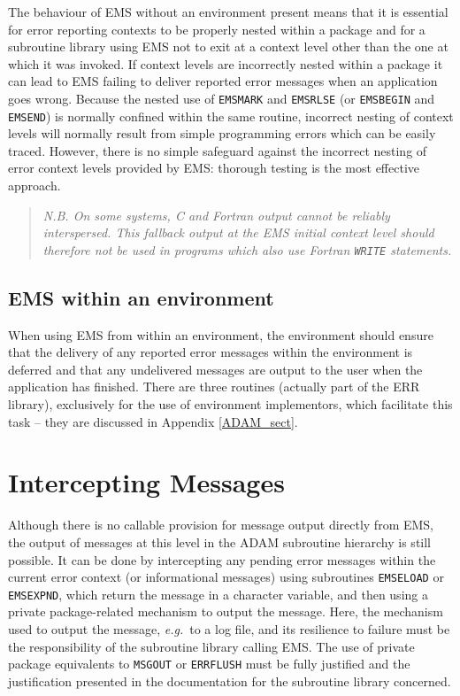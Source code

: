 \documentclass[twoside,11pt]{article}
\newcommand{\xref}[3]{#1}
\newcommand{\xlabel}[1]{}
\renewcommand{\_}{\texttt{\symbol{95}}}
\begin{document}
The behaviour of EMS without an environment present means that it is essential
for error reporting contexts to be properly nested within a package and for a
subroutine library using EMS not to exit at a context level other than the
one at which it was invoked.
If context levels are incorrectly nested within a package it can lead to 
EMS failing to deliver reported error messages when an application goes wrong.
Because the nested use of \texttt{EMS\_MARK} and \texttt{EMS\_RLSE} 
(or \texttt{EMS\_BEGIN} and 
\texttt{EMS\_END}) is normally confined within the same routine, incorrect
nesting of context levels will normally result from simple programming errors
which can be easily traced.
However, there is no simple safeguard against the incorrect nesting of error
context levels provided by EMS: thorough testing is the most effective
approach.
\begin{quote}
\emph{N.B. On some systems, C and Fortran output cannot be reliably
interspersed. This fallback output at the  EMS initial context level should
therefore not be used in programs which also use Fortran \texttt{WRITE}
statements.}
\end{quote}

\subsection{\xlabel{ems_within_an_environment}EMS within an environment}
When using EMS from within an environment, the environment should ensure that 
the delivery of any reported error messages within the environment is deferred
and that any undelivered messages are output to the user when the application 
has finished.
There are three routines (actually part of the ERR library), exclusively for
the use of environment implementors, which facilitate this task -- they are
discussed in Appendix \ref{ADAM_sect}.

\section{\xlabel{intercepting_messages}\label{intercepting_messages}Intercepting Messages}
Although there is no callable provision for message output directly from
EMS, the  output of messages at this level in the ADAM subroutine hierarchy is
still possible. 
It can be done by intercepting any pending error messages within the current
error context (or informational messages) using subroutines \texttt{EMS\_ELOAD}
or
\texttt{EMS\_EXPND}, which return the message in a character variable, and then
using a private package-related mechanism to output the message. 
Here, the mechanism used to output the message, \textit{e.g.}\ to a log file,
and its resilience to failure must be the responsibility of the subroutine
library calling EMS.
The use of private package equivalents to 
\xref{\texttt{MSG\_OUT}}{sun104}{MSG_OUT}
or
\xref{\texttt{ERR\_FLUSH}}{sun104}{ERR_FLUSH}
must be fully justified and the justification presented in the documentation
for the subroutine library concerned.
\end{document}

